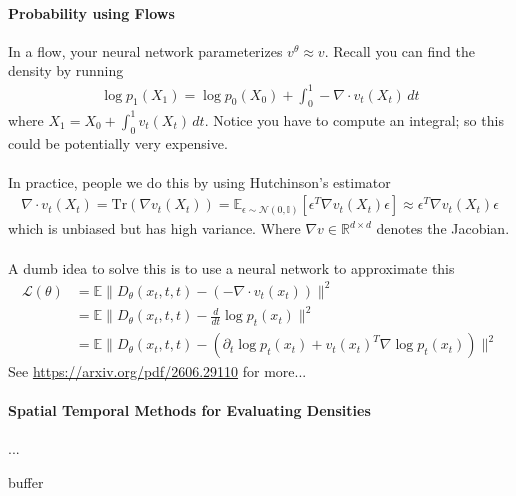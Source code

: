 \documentclass[11pt,fleqn]{article}
\numberwithin{equation}{section}
\theoremstyle{definition}
\theoremstyle{definition}
\begin{document}
\paragraph{Probability using Flows} In a flow, your neural network parameterizes $v^\theta \approx v$. Recall you can find the density by running
\begin{align}
	\log p_1(X_1) = \log p_0(X_0) + \int_0^1 - \nabla \cdot v_t(X_t) \, dt
\end{align}
where $X_1 = X_0 + \int_0^1 v_t(X_t) \, dt$. Notice you have to compute an integral; so this could be potentially very expensive.\\
\\
In practice, people we do this by using Hutchinson's estimator
\begin{align}
	\nabla \cdot v_t(X_t) = \text{Tr}(\nabla v_t(X_t)) = \mathbb E_{\epsilon \sim \mathcal N(0, \mathbb I)} [\epsilon^T \nabla v_t(X_t) \epsilon] \approx \epsilon^T \nabla v_t(X_t) \epsilon
\end{align}
which is unbiased but has high variance. Where $\nabla v \in \mathbb R^{d \times d}$ denotes the Jacobian.\\
\\
A dumb idea to solve this is to use a neural network to  approximate this
\begin{align}
	\mathcal L(\theta) & = \mathbb E\|D_\theta(x_t, t,t) - (-\nabla \cdot v_t(x_t))\|^2\\
	& = \mathbb E \| D_\theta(x_t, t, t) - \frac{d}{dt} \log p_t(x_t)\|^2\\
	& = \mathbb E\| D_\theta(x_t, t, t) - (\partial_t \log p_t(x_t) + v_t(x_t)^T \nabla \log p_t(x_t))\|^2
\end{align}
See \url{https://arxiv.org/pdf/2606.29110} for more...

\paragraph{Spatial Temporal Methods for Evaluating Densities}
... 

























\newpage
buffer
\end{document}
